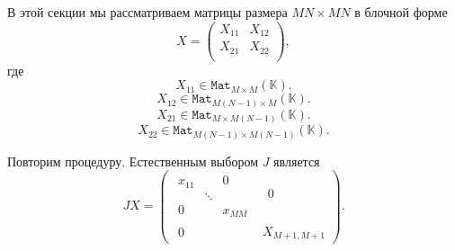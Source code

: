 \documentclass[14pt,a4paper]{extarticle}
\theoremstyle{definition}
\begin{document}
В этой секции мы рассматриваем матрицы размера
    \( {MN}{\times}{MN} \)
    в блочной форме
    \[
    X =
        \left(\begin{array}{c|c}
              X_{11} & X_{12} \\ \hline
              X_{21} & X_{22} \\
        \end{array}\right),
    \]
где
\[ X_{11} \in \mathtt{Mat}_{M{\times}M}(\mathbb{K}).\]
\[ X_{12} \in \mathtt{Mat}_{M(N-1){\times}M}(\mathbb{K}).\]
\[ X_{21} \in \mathtt{Mat}_{M{\times}M(N-1)}(\mathbb{K}).\]
\[ X_{22} \in \mathtt{Mat}_{M(N-1){\times}M(N-1)}(\mathbb{K}).\]

Повторим процедуру.
Естественным выбором \( J \) является
\[
        J X =
        \left(\begin{array}{c|c}
            \begin{matrix}
                x_{11} &  & 0 \\
                 & \ddots &  \\
                0 &  & x_{MM}
            \end{matrix} &
            \begin{matrix}
                0 \\
            \end{matrix} \\ \hline
            \begin{matrix}
                0 &
            \end{matrix} &
            X_{M+1,M+1}
        \end{array}\right).
\]
\end{document}
